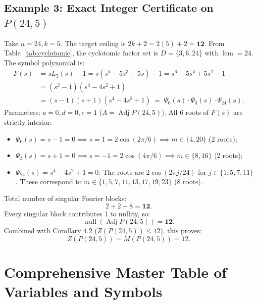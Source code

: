 \documentclass[11pt]{article}
\begin{document}
\subsection{Example 3: Exact Integer Certificate on $P(24,5)$}

Take $n=24, k=5$. The target ceiling is $2k+2 = 2(5)+2 = \mathbf{12}$.
From Table~\ref{tab:cyclotomic}, the cyclotomic factor set is $D = \{3, 6, 24\}$ with $\operatorname{lcm} = 24$.
The symbol polynomial is:
\begin{align}
  F(s) &= s L_5(s) - 1 = s(s^5 - 5s^3 + 5s) - 1 = s^6 - 5s^4 + 5s^2 - 1 \nonumber \\
  &= (s^2 - 1)(s^4 - 4s^2 + 1) \nonumber \\
  &= (s - 1)(s + 1)(s^4 - 4s^2 + 1) \;=\; \Psi_6(s) \cdot \Psi_3(s) \cdot \Psi_{24}(s).
\end{align}
Parameters: $a=0, d=0, c=1$ ($A = \operatorname{Adj} P(24,5)$).
All 6 roots of $F(s)$ are strictly interior:
\begin{itemize}[leftmargin=*,nosep]
  \item $\Psi_6(s) = s - 1 = 0 \implies s = 1 = 2\cos(2\pi/6) \implies m \in \{4, 20\}$ (2 roots);
  \item $\Psi_3(s) = s + 1 = 0 \implies s = -1 = 2\cos(4\pi/6) \implies m \in \{8, 16\}$ (2 roots);
  \item $\Psi_{24}(s) = s^4 - 4s^2 + 1 = 0$: The roots are $2\cos(2\pi j / 24)$ for $j \in \{1, 5, 7, 11\}$.
  These correspond to $m \in \{1, 5, 7, 11, 13, 17, 19, 23\}$ (8 roots).
\end{itemize}
Total number of singular Fourier blocks:
\begin{equation}
  2 + 2 + 8 = \mathbf{12}.
\end{equation}
Every singular block contributes 1 to nullity, so:
\begin{equation}
  \operatorname{null}(\operatorname{Adj} P(24, 5)) = \mathbf{12}.
\end{equation}
Combined with Corollary 4.2 ($Z(P(24,5)) \le 12$), this proves:
\begin{equation}
  Z(P(24, 5)) = M(P(24, 5)) = 12.
\end{equation}

\newpage

\section{Comprehensive Master Table of Variables and Symbols}
\end{document}
